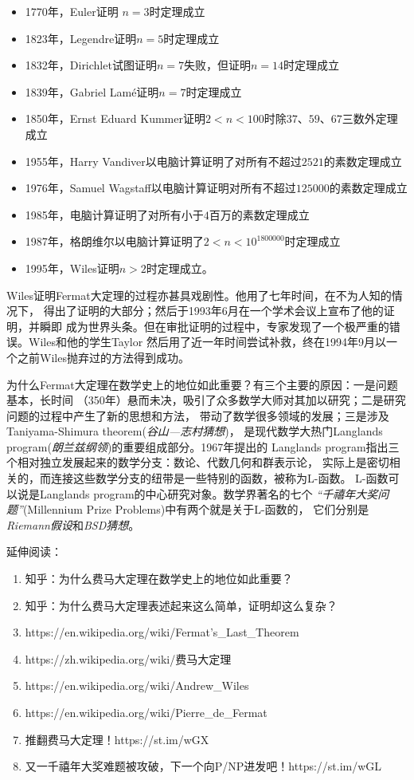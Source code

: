 \begin{shaded}
	\begin{itemize}
	  \setlength{\itemindent}{1cm}
	  \item 1770年，Euler证明 $n=3$时定理成立
	  \item 1823年，Legendre证明$n=5$时定理成立
      \item 1832年，Dirichlet试图证明$n=7$失败，但证明$n=14$时定理成立
	  \item 1839年，Gabriel Lamé证明$n=7$时定理成立
	  \item 1850年，Ernst Eduard Kummer证明$2<n<100$时除$37$、$59$、$67$三数外定理成立
	  \item 1955年，Harry Vandiver以电脑计算证明了对所有不超过$2521$的素数定理成立
	  \item 1976年，Samuel Wagstaff以电脑计算证明对所有不超过$125000$的素数定理成立
	  \item 1985年，电脑计算证明了对所有小于$4$百万的素数定理成立
	  \item 1987年，格朗维尔以电脑计算证明了$2<n<10^{{1800000}}$时定理成立
	  \item 1995年，Wiles证明$n>2$时定理成立。
	\end{itemize}
	
	Wiles证明Fermat大定理的过程亦甚具戏剧性。他用了七年时间，在不为人知的情况下，
	得出了证明的大部分；然后于1993年6月在一个学术会议上宣布了他的证明，并瞬即
	成为世界头条。但在审批证明的过程中，专家发现了一个极严重的错误。Wiles和他的学生Taylor
	然后用了近一年时间尝试补救，终在1994年9月以一个之前Wiles抛弃过的方法得到成功。
	
	为什么Fermat大定理在数学史上的地位如此重要？有三个主要的原因：一是问题基本，长时间
	（350年）悬而未决，吸引了众多数学大师对其加以研究；二是研究问题的过程中产生了新的思想和方法，
	带动了数学很多领域的发展；三是涉及Taniyama-Shimura theorem({\it 谷山—志村猜想})，
	是现代数学大热门Langlands program({\it 朗兰兹纲领})的重要组成部分。1967年提出的
	Langlands program指出三个相对独立发展起来的数学分支：数论、代数几何和群表示论，
	实际上是密切相关的，而连接这些数学分支的纽带是一些特别的函数，被称为L-函数。
	L-函数可以说是Langlands program的中心研究对象。数学界著名的七个
	{\it “千禧年大奖问题”}(Millennium Prize Problems)中有两个就是关于L-函数的，
	它们分别是{\it Riemann假设}和{\it BSD猜想}。
	
	延伸阅读：
	\begin{enumerate}[1.]
	  \setlength{\itemindent}{1cm}
	  \item 知乎：为什么费马大定理在数学史上的地位如此重要？
	  \item 知乎：为什么费马大定理表述起来这么简单，证明却这么复杂？
	  \item https://en.wikipedia.org/wiki/Fermat's\_Last\_Theorem
	  \item https://zh.wikipedia.org/wiki/费马大定理
	  \item https://en.wikipedia.org/wiki/Andrew\_Wiles
	  \item https://en.wikipedia.org/wiki/Pierre\_de\_Fermat
	  \item 推翻费马大定理！https://st.im/wGX
	  \item 又一千禧年大奖难题被攻破，下一个向P/NP进发吧！https://st.im/wGL
	\end{enumerate}
\end{shaded}

